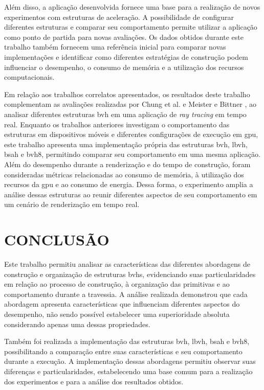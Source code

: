 Além disso, a aplicação desenvolvida fornece uma base para a realização de novos experimentos com estruturas de aceleração. A possibilidade de configurar diferentes estruturas e comparar seu comportamento permite utilizar a aplicação como ponto de partida para novas avaliações. Os dados obtidos durante este trabalho também fornecem uma referência inicial para comparar novas implementações e identificar como diferentes estratégias de construção podem influenciar o desempenho, o consumo de memória e a utilização dos recursos computacionais.

Em relação aos trabalhos correlatos apresentados, os resultados deste trabalho complementam as avaliações realizadas por Chung et al. \cite{chung2018comparison} e Meister e Bittner \cite{meister2022performance}, ao analisar diferentes estruturas \gls{bvh} em uma aplicação de \textit{ray tracing} em tempo real. Enquanto os trabalhos anteriores investigam o comportamento das estruturas em dispositivos móveis e diferentes configurações de execução em \gls{gpu}, este trabalho apresenta uma implementação própria das estruturas \gls{bvh}, \gls{lbvh}, \gls{bsah} e \gls{bvh8}, permitindo comparar seu comportamento em uma mesma aplicação. Além do desempenho durante a renderização e do tempo de construção, foram consideradas métricas relacionadas ao consumo de memória, à utilização dos recursos da \gls{gpu} e ao consumo de energia. Dessa forma, o experimento amplia a análise dessas estruturas ao reunir diferentes aspectos de seu comportamento em um cenário de renderização em tempo real.

\chapter{CONCLUSÃO}

Este trabalho permitiu analisar as características das diferentes abordagens de construção e organização de estruturas \glspl{bvh}, evidenciando suas particularidades em relação ao processo de construção, à organização das primitivas e ao comportamento durante a travessia. A análise realizada demonstrou que cada abordagem apresenta características que influenciam diferentes aspectos do desempenho, não sendo possível estabelecer uma superioridade absoluta considerando apenas uma dessas propriedades.

Também foi realizada a implementação das estruturas \gls{bvh}, \gls{lbvh}, \gls{bsah} e \gls{bvh8}, possibilitando a comparação entre suas características e seu comportamento durante a execução. A implementação dessas abordagens permitiu observar suas diferenças e particularidades, estabelecendo uma base comum para a realização dos experimentos e para a análise dos resultados obtidos.


